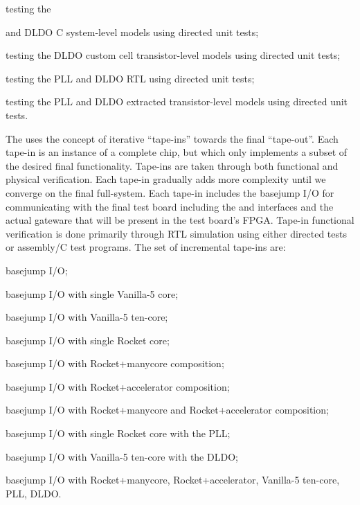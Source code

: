 \begin{cbxlist}{1.5em}{1em}{1em}
\begin{cbxlist}[--]{1.5em}{0em}{0em}
      \item testing the 

 and DLDO C system-level models using directed
         unit tests;

      \item testing the DLDO custom cell transistor-level models using
         directed unit tests;

      \item testing the PLL and DLDO RTL using directed unit tests;

      \item testing the PLL and DLDO extracted transistor-level models
         using directed unit tests.

    \end{cbxlist}

 \item The  uses the
    concept of iterative ``tape-ins'' towards the final ``tape-out''.
    Each tape-in is an instance of a complete chip, but which only
    implements a subset of the desired final functionality. Tape-ins are
    taken through both functional and physical verification. Each tape-in
    gradually adds more complexity until we converge on the final
    full-system. Each tape-in includes the basejump I/O for communicating
    with the final test board including the  and
     interfaces and the actual gateware that will be present
    in the test board's FPGA. Tape-in functional verification is done
    primarily through RTL simulation using either directed tests or
    assembly/C test programs. The set of incremental tape-ins are:

    \smallskip
    \begin{cbxlist}[--]{1.5em}{0em}{0em}
      \raggedright

      \item basejump I/O;
      \item basejump I/O with single Vanilla-5 core;
      \item basejump I/O with Vanilla-5 ten-core;
      \item basejump I/O with single Rocket core;
      \item basejump I/O with Rocket+manycore composition;
      \item basejump I/O with Rocket+accelerator composition;
      \item basejump I/O with Rocket+manycore and Rocket+accelerator composition;
      \item basejump I/O with single Rocket core with the PLL;
      \item basejump I/O with Vanilla-5 ten-core with the DLDO;
      \item basejump I/O with Rocket+manycore, Rocket+accelerator,
         Vanilla-5 ten-core, PLL, DLDO.


\end{cbxlist}
\end{cbxlist}
